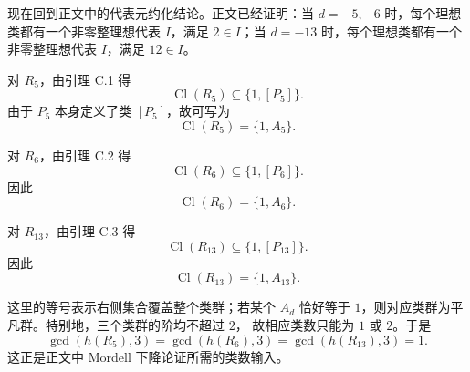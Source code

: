 现在回到正文中的代表元约化结论。正文已经证明：当
\(d=-5,-6\) 时，每个理想类都有一个非零整理想代表 \(I\)，满足
\(2\in I\)；当 \(d=-13\) 时，每个理想类都有一个非零整理想代表
\(I\)，满足 \(12\in I\)。

对 \(R_5\)，由引理 C.1 得
\[
\operatorname{Cl}(R_5)\subseteq\{1,[P_5]\}.
\]
由于 \(P_5\) 本身定义了类 \([P_5]\)，故可写为
\[
\operatorname{Cl}(R_5)=\{1,A_5\}.
\]

对 \(R_6\)，由引理 C.2 得
\[
\operatorname{Cl}(R_6)\subseteq\{1,[P_6]\}.
\]
因此
\[
\operatorname{Cl}(R_6)=\{1,A_6\}.
\]

对 \(R_{13}\)，由引理 C.3 得
\[
\operatorname{Cl}(R_{13})\subseteq\{1,[P_{13}]\}.
\]
因此
\[
\operatorname{Cl}(R_{13})=\{1,A_{13}\}.
\]

这里的等号表示右侧集合覆盖整个类群；若某个 \(A_d\) 恰好等于
\(1\)，则对应类群为平凡群。特别地，三个类群的阶均不超过 \(2\)，
故相应类数只能为 \(1\) 或 \(2\)。于是
\[
\gcd(h(R_5),3)=\gcd(h(R_6),3)=\gcd(h(R_{13}),3)=1.
\]
这正是正文中 Mordell 下降论证所需的类数输入。

\endgroup

